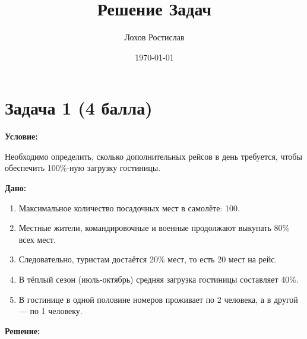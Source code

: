 \documentclass[a4paper,12pt]{article}
\title{Решение Задач}
\author{Лохов Ростислав}
\date{\today}
\begin{document}
\maketitle

\section*{Задача 1 (4 балла)}

\textbf{Условие:} 

Необходимо определить, сколько дополнительных рейсов в день требуется, чтобы обеспечить 100\%-ную загрузку гостиницы. 

\textbf{Дано:}
\begin{enumerate}
    \item Максимальное количество посадочных мест в самолёте: 100.
    \item Местные жители, командировочные и военные продолжают выкупать 80\% всех мест.
    \item Следовательно, туристам достаётся 20\% мест, то есть 20 мест на рейс.
    \item В тёплый сезон (июль-октябрь) средняя загрузка гостиницы составляет 40\%.
    \item В гостинице в одной половине номеров проживает по 2 человека, а в другой — по 1 человеку.
\end{enumerate}

\textbf{Решение:}
\end{document}
